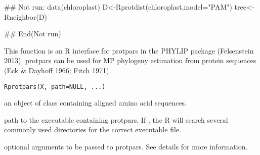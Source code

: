 \documentclass[a4paper]{book}
\begin{document}
%
\begin{Examples}
\begin{ExampleCode}
## Not run: 
data(chloroplast)
D<-Rprotdist(chloroplast,model="PAM")
tree<-Rneighbor(D)

## End(Not run)
\end{ExampleCode}
\end{Examples}
%
\begin{Description}\relax
This function is an R interface for protpars in the PHYLIP package (Felsenstein 2013). protpars can be used for MP phylogeny estimation from protein sequences (Eck \& Dayhoff 1966; Fitch 1971).
\end{Description}
%
\begin{Usage}
\begin{verbatim}
Rprotpars(X, path=NULL, ...)
\end{verbatim}
\end{Usage}
%
\begin{Arguments}
\begin{ldescription}
\item[\code{X}] an object of class  containing aligned amino acid sequences.
\item[\code{path}] path to the executable containing protpars. If , the R will search several commonly used directories for the correct executable file.
\item[\code{...}] optional arguments to be passed to protpars. See details for more information.
\end{ldescription}
\end{Arguments}
%
\end{document}
